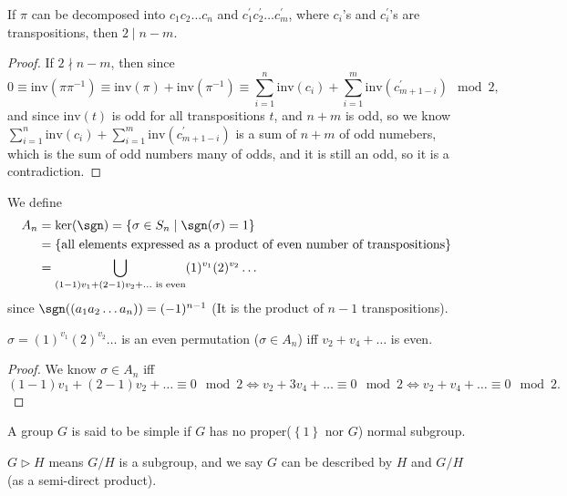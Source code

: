     \begin{proposition}
        If \(\pi \) can be decomposed into \(c_1 c_2 \dots c_n\) and \(c_1^{\prime} c_2^{\prime} \dots c_m^{\prime} \), where \(c_i\)'s and \(c_i^{\prime} \)'s are transpositions, then \(2 \mid n - m\).      
    \end{proposition}
    \begin{proof}
        If \(2 \nmid n - m\), then since 
        \[
            0 \equiv \mathrm{inv}(\pi \pi ^{-1}) \equiv \mathrm{inv}(\pi ) + \mathrm{inv}(\pi ^{-1}) \equiv \sum_{i=1}^n \mathrm{inv}(c_i) + \sum_{i=1}^m \mathrm{inv}(c^{\prime} _{m + 1 - i}) \mod{2},      
        \]  
        and since \(\mathrm{inv}(t) \) is odd for all transpositions \(t\), and \(n + m\) is odd, so we know \(\sum_{i=1}^n \mathrm{inv}(c_i) + \sum_{i=1}^m \mathrm{inv}(c^{\prime} _{m + 1 - i})\) is a sum of \(n + m\) of odd numebers, which is the sum of odd numbers many of odds, and it is still an odd, so it is a contradiction. 
    \end{proof}

    \begin{definition}
        We define 
        \begin{align*}
            A_n &= \ker (\sgn ) = \left\{ \sigma \in S_n \mid \sgn (\sigma ) = 1 \right\} \\
            &= \left\{ \text{all elements expressed as a product of even number of transpositions}  \right\} \\
            &= \bigcup_{(1-1)v_1 + (2-1)v_2 + \dots \text{ is even} } (1)^{v_1} (2)^{v_2} \dots    
        \end{align*}
        since \(\sgn ((a_1 a_2 \dots a_n)) = (-1)^{n-1}\) (It is the product of \(n-1\) transpositions). 
    \end{definition}

    \begin{proposition}
        \(\sigma =(1)^{v_1}(2)^{v_2} \dots \) is an even permutation (\(\sigma \in A_n\)) iff \(v_2 + v_4 + \dots \) is even. 
    \end{proposition}
    \begin{proof}
        We know \(\sigma \in A_n\) iff
        \[
            (1 - 1) v_1 + (2 - 1)v_2 + \dots \equiv 0 \mod{2} \iff v_2 + 3v_4 + \dots \equiv 0 \mod{2} \iff v_2 + v_4 +\dots \equiv 0 \mod{2}.
        \]
    \end{proof}

\begin{definition}
    A group \(G\) is said to be simple if \(G\) has no proper(\(\left\{ 1 \right\} \) nor \(G\)) normal subgroup.   
\end{definition}
\begin{note}
    \(G \triangleright H\) means \(G / H\) is a subgroup, and we say \(G\) can be described by \(H\) and \(G / H\) (as a semi-direct product).     
\end{note}


